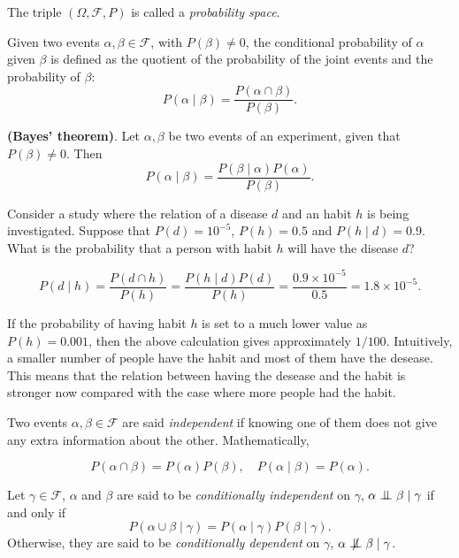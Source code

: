 The triple \((\Omega, \mathcal{F}, P)\) is called a \emph{probability space}.

\begin{definition}
  Given two events \(\alpha, \beta \in \mathcal{F}\), with \(P(\beta) \neq 0\),
  the conditional probability of \(\alpha\) given \(\beta\) is defined as the
  quotient of the probability of the joint events and the probability of
  \(\beta\):
  \[
    P(\alpha \mid \beta) = \frac{P(\alpha \cap \beta)}{P(\beta)}.
  \]
\end{definition}

\begin{theorem}
  \textbf{(Bayes' theorem)}. Let \(\alpha, \beta\) be two events of an
  experiment, given that \(P(\beta) \neq 0\). Then
  \[
  P(\alpha \mid \beta)= \frac{P(\beta \mid \alpha)P(\alpha)}{P(\beta)}.
\]
\end{theorem}

\begin{exampleth}
Consider a study where the relation of a disease \(d\) and an habit \(h\)
is being investigated. Suppose that \(P(d)=10^{-5}\), \(P(h)=0.5\) and \(P(h\mid d) = 0.9\). What is the
probability that a person with habit \(h\) will have the disease \(d\)?

\[
P(d \mid h) = \frac{P(d \cap h)}{P(h)} = \frac{P(h \mid d)P(d)}{P(h)} =
\frac{ 0.9 \times 10^{-5}}{ 0.5 } = 1.8 \times 10^{-5}.
\]

If the probability of having habit \(h\) is set to a much lower value as \(P(h) =
0.001\), then the above calculation gives approximately \(1/100\). Intuitively, a smaller number of people have the habit and most of them have the
desease. This means that the relation between having the desease and the habit
is stronger now compared with the case where more people had the habit.
\end{exampleth}

\begin{definition}
  Two events \(\alpha, \beta \in \mathcal{F}\) are said
  \emph{independent} if knowing one of them does not give any extra information
  about the other. Mathematically,

  \[
    P(\alpha \cap \beta) = P(\alpha)P(\beta), \quad P(\alpha \mid \beta) = P(\alpha).
  \]

  Let \(\gamma \in \mathcal{F}\), \(\alpha\) and \(\beta\) are said to be
  \emph{conditionally independent} on \(\gamma\), \(\alpha \bigCI \beta \mid \gamma\)
  if and only if
  \[
    P(\alpha \cup \beta \mid \gamma) = P(\alpha \mid \gamma)P(\beta \mid \gamma).
  \]
  Otherwise, they are said to be \emph{conditionally dependent} on \(\gamma\),  \(\alpha \bigCD \beta \mid \gamma\).

\end{definition}

